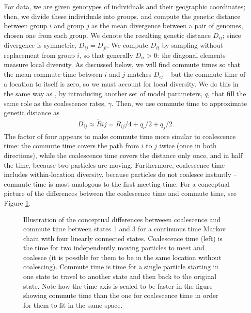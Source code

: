 \documentclass{article}
\newcommand{\comdist}{\widetilde R}
\begin{document}
For data, we are given genotypes of individuals and their geographic coordinates;
then, we divide these individuals into groups,
and compute the genetic distance between group $i$ and group $j$
as the mean divergence between a pair of genomes, chosen one from each group.
We denote the resulting genetic distance $D_{ij}$;
since divergence is symmetric, $D_{ij} = D_{ji}$.
We compute $D_{ii}$ by sampling without replacement from group $i$,
so that generally $D_{ii} > 0$: the diagonal elements measure local diversity.
As discussed below, we will find commute times so that the mean commute time between
$i$ and $j$ matches $D_{ij}$ -- but the commute time of a location to itself is zero,
so we must account for local diversity.
We do this in the same way as \citet{petkova2016visualizing},
by introducing another set of model parameters, $q$, 
that fill the same role as the coalescence rates, $\gamma$.
Then, we use commute time to approximate genetic distance as
\begin{align} \label{eq:commute_approx}
	D_{ij} \approx \comdist{ij} = R_{ij}/4 + q_{i}/2 + q_{j}/2 .
\end{align}
The factor of four appears to make commute time more similar to coalescence time:
the commute time covers the path from $i$ to $j$ twice
(once in both directions),
while the coalescence time covers the distance only once,
and in half the time, because two particles are moving.
Furthermore, coalescence time includes within-location diversity,
because particles do not coalesce instantly --
commute time is most analogous to the first meeting time.
For a conceptual picture of the differences between the coalescence time and commute time,
see Figure \ref{fig:concept_coalcom}. 

\begin{figure}
\centering
    \caption{
    Illustration of the conceptual differences
    betweeen coalescence and commute time between states 1 and 3 
    for a continuous time Markov chain with four linearly connected states. 
    Coalescence time (left) is the time for two independently moving particles to meet and coalesce 
    (it is possible for them to be in the same location without coalescing).
    Commute time is time for a single particle starting in one state to travel to another state 
    and then back to the original state.
    Note how the time axis is scaled to be faster in the figure showing commute time
    than the one for coalescence time in order for them to fit in the same space.
    } \label{fig:concept_coalcom}
\end{figure}
\end{document}
